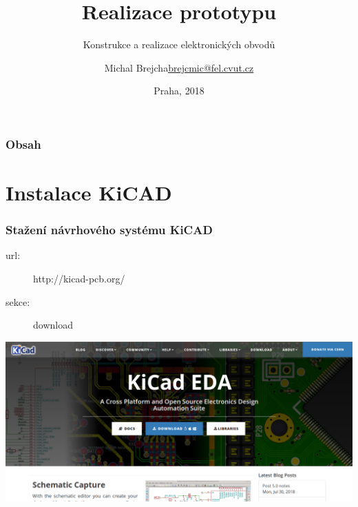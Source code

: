 \documentclass{beamer}
\title[Realizace prototypu]{Realizace prototypu}
\subtitle[KEO] {Konstrukce a realizace elektronických obvodů}
\author[Brejcha]{\texorpdfstring{Michal Brejcha\newline\url{brejcmic@fel.cvut.cz}}{Michal Brejcha}}
\institute[CVUT]{ČVUT v Praze, FEL}
\date[Praha, 2018]{Praha, 2018}
\begin{document}
\frame{\titlepage}

\begin{frame}
\frametitle{Obsah} 
\tableofcontents
\end{frame}


\section{\texorpdfstring{Instalace KiCAD}{Instalace Kicad}}
	\begin{frame}
    \frametitle{Stažení návrhového systému KiCAD}
		
		\begin{description}
			\item[url:] http://kicad-pcb.org/
			\item[sekce:] download
		\end{description}
		
		\begin{center}
			\includegraphics[scale=0.3]{obr/kicad_url.png}
		\end{center}
	\end{frame}
\end{document}
